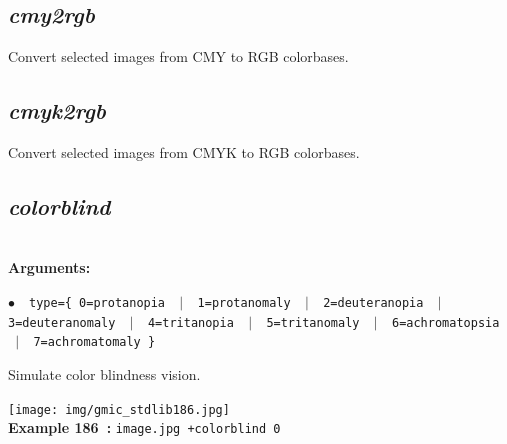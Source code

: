 \documentclass[a4paper,10.5pt,twoside]{book}
\newcommand{\Cb}[1]{\textcolor{cb}{#1}}
\begin{document}
\subsection{\emph{cmy2rgb} }\vspace*{-0.7em}
Convert selected images from CMY to RGB colorbases.


\subsection{\emph{cmyk2rgb} }\vspace*{-0.7em}
Convert selected images from CMYK to RGB colorbases.


\subsection{\emph{colorblind} }\vspace*{-0.7em}
~\\\textbf{\Cb{Arguments: }}\begin{flushleft}
{\small \Cb{\hspace*{0.5cm}$\bullet$~~\texttt{type=\{ 0=protanopia ~$|$~ 1=protanomaly ~$|$~ 2=deuteranopia ~$|$~ 3=deu\-teranomaly ~$|$~ 4=tritanopia ~$|$~ 5=tritanomaly ~$|$~ 6=achromatopsia \-~$|$~ 7=achromatomaly \}}}}\end{flushleft}
Simulate color blindness vision.
\begin{center}\texttt{[image: img/gmic\_stdlib186.jpg]}\\
{\footnotesize \textbf{Example 186~:} \texttt{image.jpg +colorblind 0}}
\end{center}
\end{document}
